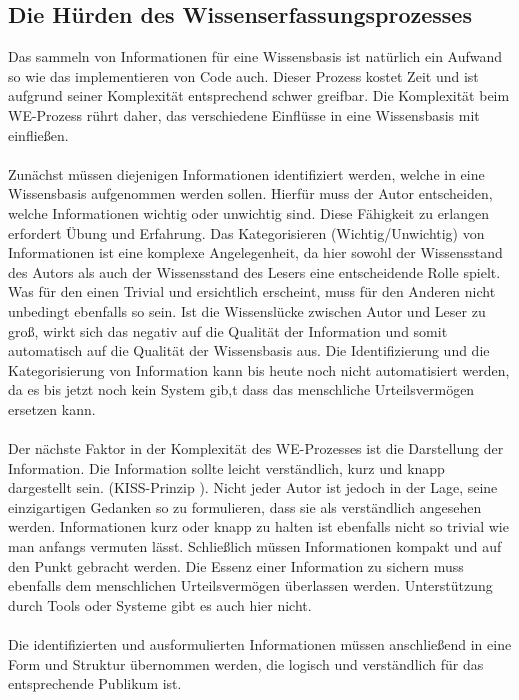 \documentclass[a4paper,12pt]{scrartcl}
\begin{document}
\subsection{Die Hürden des Wissenserfassungsprozesses}
Das sammeln von Informationen für eine Wissensbasis ist natürlich ein Aufwand so wie das implementieren von Code auch. Dieser Prozess kostet Zeit und ist aufgrund seiner Komplexität entsprechend schwer greifbar. Die Komplexität beim WE-Prozess rührt daher, das verschiedene Einflüsse in eine Wissensbasis mit einfließen.
\\\\
Zunächst müssen diejenigen Informationen identifiziert werden, welche in eine Wissensbasis aufgenommen werden sollen. Hierfür muss der Autor entscheiden, welche Informationen wichtig oder unwichtig sind. Diese Fähigkeit zu erlangen erfordert Übung und Erfahrung. Das Kategorisieren (Wichtig/Unwichtig) von Informationen ist eine komplexe Angelegenheit, da hier sowohl der Wissensstand des Autors als auch der Wissensstand des Lesers eine entscheidende Rolle spielt. Was für den einen Trivial und ersichtlich erscheint, muss für den Anderen nicht unbedingt ebenfalls so sein. Ist die Wissenslücke zwischen Autor und Leser zu groß, wirkt sich das negativ auf die Qualität der Information und somit automatisch auf die Qualität der Wissensbasis aus. Die Identifizierung und die Kategorisierung von Information kann bis heute noch nicht automatisiert werden, da es bis jetzt noch kein System gib,t dass das menschliche Urteilsvermögen ersetzen kann.
\\\\
Der nächste Faktor in der Komplexität des WE-Prozesses ist die Darstellung der Information. Die Information sollte leicht verständlich, kurz und knapp dargestellt sein. (KISS-Prinzip\footnotemark
). Nicht jeder Autor ist jedoch in der Lage, seine einzigartigen Gedanken so zu formulieren, dass sie als verständlich angesehen werden. Informationen kurz oder knapp zu halten ist ebenfalls nicht so trivial wie man anfangs vermuten lässt. Schließlich müssen Informationen kompakt und auf den Punkt gebracht werden. Die Essenz einer Information zu sichern muss ebenfalls dem menschlichen Urteilsvermögen überlassen werden. Unterstützung durch Tools oder Systeme gibt es auch hier nicht.
\\\\
Die identifizierten und ausformulierten Informationen müssen anschließend in eine Form und Struktur übernommen werden, die logisch und verständlich für das entsprechende Publikum ist. 
\end{document}
